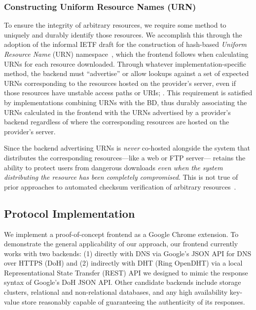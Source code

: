 \subsubsection{Constructing Uniform Resource Names (URN)}

To ensure the integrity of arbitrary resources, we require some method to
uniquely and durably identify those resources. We accomplish this through the
adoption of the informal IETF draft for the construction of hash-based
\emph{Uniform Resource Name} (URN) namespace~\cite{draft-URN}, which the
frontend follows when calculating URNs for each resource downloaded. Through
whatever implementation-specific method, the backend must ``advertise'' or allow
lookups against a set of expected URNs corresponding to the resources hosted on
the provider's server, even if those resources have unstable access paths or
URIs; . This requirement is satisfied by implementations combining URNs with
the BD, thus durably associating the URNs calculated in the frontend with the
URNs advertised by a provider's backend regardless of where the corresponding
resources are hosted on the provider's server.

Since the backend advertising URNs is \emph{never} co-hosted alongside the
system that distributes the corresponding resources---like a web or FTP
server---\SYSTEM{} retains the ability to protect users from dangerous downloads
\emph{even when the system distributing the resource has been completely
compromised}. This is not true of prior approaches to automated checksum
verification of arbitrary resources~\cite{Cherubini}.

\subsection{Protocol Implementation}


We implement a proof-of-concept \SYSTEM{} frontend as a Google Chrome extension.
To demonstrate the general applicability of our approach, our frontend currently
works with two backends: (1) directly with DNS via Google's JSON API for DNS
over HTTPS (DoH) and (2) indirectly with DHT (Ring OpenDHT) via a local
Representational State Transfer (REST) API we designed to mimic the response
syntax of Google's DoH JSON API. Other candidate backends include storage
clusters, relational and non-relational databases, and any high availability
key-value store reasonably capable of guaranteeing the authenticity of its
responses.

